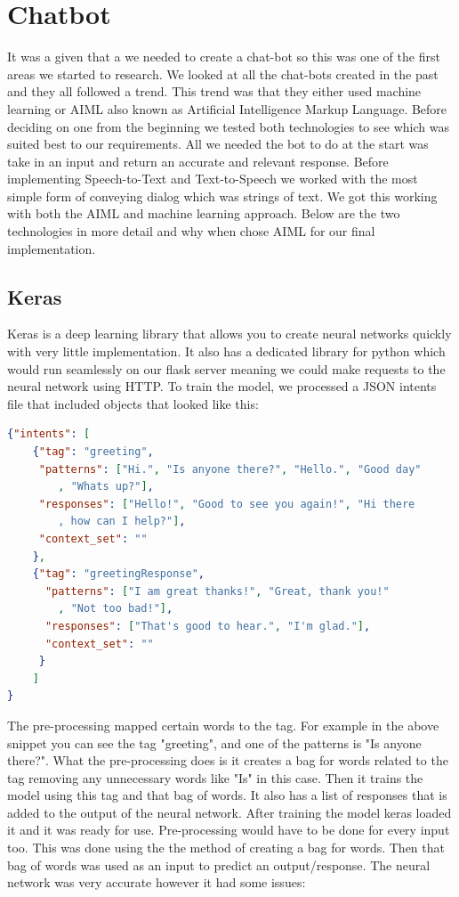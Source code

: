 \section{Chatbot}
It was a given that a we needed to create a chat-bot so this was one of the first areas we started to research. We looked at all the chat-bots created in the past and they all followed a trend. This trend was that they either used machine learning or AIML also known as Artificial Intelligence Markup Language. Before deciding on one from the beginning we tested both technologies to see which was suited best to our requirements. All we needed the bot to do at the start was take in an input and return an accurate and relevant response. Before implementing Speech-to-Text and Text-to-Speech we worked with the most simple form of conveying dialog which was strings of text. We got this working with both the AIML and machine learning approach. Below are the two technologies in more detail and why when chose AIML for our final implementation.

\subsection{Keras}
Keras is a deep learning library that allows you to create neural networks quickly with very little implementation\cite{chollet2018keras}. It also has a dedicated library for python which would run seamlessly on our flask server meaning we could make requests to the neural network using HTTP. To train the model, we processed a JSON intents file that included objects that looked like this:\cite{18Python81:online}

\begin{lstlisting}[language=JSON]
{"intents": [
    {"tag": "greeting",
     "patterns": ["Hi.", "Is anyone there?", "Hello.", "Good day"
        , "Whats up?"],
     "responses": ["Hello!", "Good to see you again!", "Hi there
        , how can I help?"],
     "context_set": ""
    },
    {"tag": "greetingResponse",
      "patterns": ["I am great thanks!", "Great, thank you!"
        , "Not too bad!"],
      "responses": ["That's good to hear.", "I'm glad."],
      "context_set": ""
     }
    ]
}
\end{lstlisting}

The pre-processing mapped certain words to the tag. For example in the above snippet you can see the tag "greeting", and one of the patterns is "Is anyone there?". What the pre-processing does is it creates a bag for words related to the tag removing any unnecessary words like "Is" in this case. Then it trains the model using this tag and that bag of words. It also has a list of responses that is added to the output of the neural network. After training the model keras loaded it and it was ready for use. Pre-processing would have to be done for every input too. This was done using the the method of creating a bag for words. Then that bag of words was used as an input to predict an output/response. The neural network was very accurate however it had some issues:

